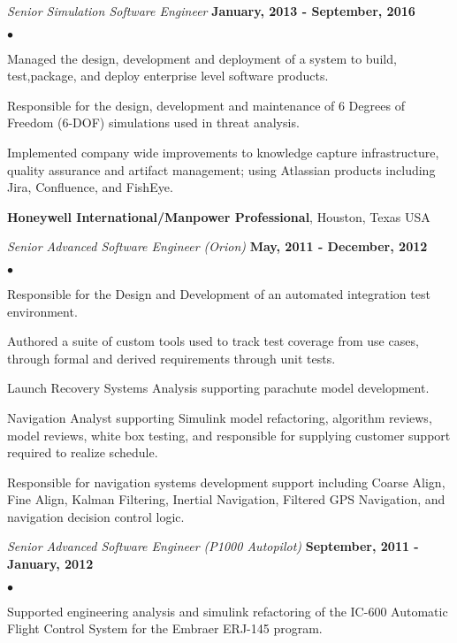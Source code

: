 \documentclass[margin,line]{res}
\newenvironment{list2}{%
  \begin{list}{$\bullet$}{%
      \setlength{\itemsep}{0in}
      \setlength{\parsep}{0in} \setlength{\parskip}{0in}
      \setlength{\topsep}{0in} \setlength{\partopsep}{0in} 
  \setlength{\leftmargin}{0.2in}}}{\end{list}}
\newcommand{\organization}[2] {{\bf #1}, #2\par}
\newcommand{\role}[2]{\vspace{-1em}\emph{#1} \hfill \textbf{#2}}
\begin{document}
\begin{resume}
\role{Senior Simulation Software Engineer}{January, 2013 - September, 2016}
\begin{list2}
\item Managed the design, development and deployment of a system to build, test,package, and deploy enterprise level software products.
\item Responsible for the design, development and maintenance of 6 Degrees of
    Freedom (6-DOF) simulations used in threat analysis.
\item Implemented company wide improvements to knowledge capture infrastructure, quality assurance and artifact management; using Atlassian products including Jira, Confluence, and FishEye.
\end{list2}

\organization{Honeywell International/Manpower Professional}{Houston, Texas USA}
\role{Senior Advanced Software Engineer (Orion)}{May, 2011 - December, 2012}
\begin{list2}
\item Responsible for the Design and Development of an automated integration test environment.
\item Authored a suite of custom tools used to track test coverage from use cases, through formal and derived requirements through unit tests.
\item Launch Recovery Systems Analysis supporting parachute model development.
\item Navigation Analyst supporting Simulink model refactoring, algorithm reviews, model reviews, white box testing, and responsible for supplying customer support required to realize schedule.
\item Responsible for navigation systems development support including Coarse Align, Fine Align, Kalman Filtering, Inertial Navigation, Filtered GPS Navigation, and navigation decision control logic.
\end{list2}
\role{Senior Advanced Software Engineer (P1000 Autopilot)}{\bf September, 2011 - January, 2012}
\begin{list2}
\item Supported engineering analysis and simulink refactoring of the IC-600 Automatic Flight Control System for the Embraer ERJ-145 program.
\end{list2}


\end{resume}
\end{document}
